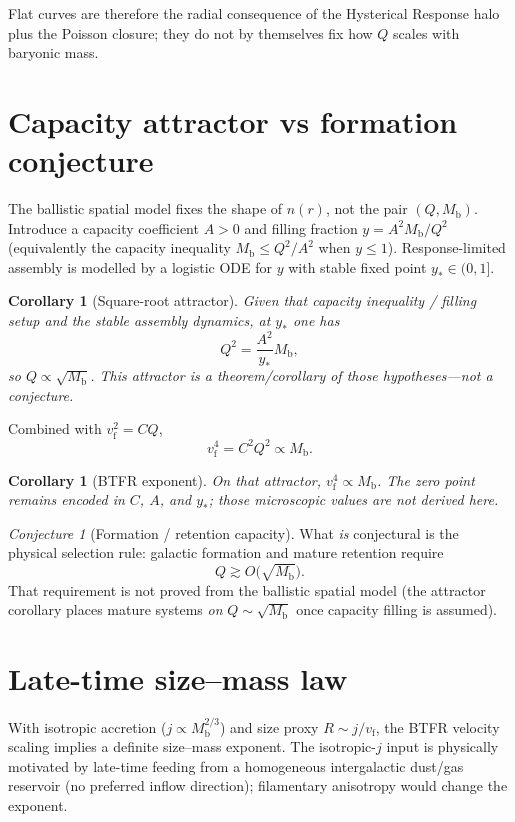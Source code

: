 \documentclass[11pt]{article}
\newtheorem{corollary}[theorem]{Corollary}
\theoremstyle{definition}
\theoremstyle{remark}
\newtheorem{conjecture}{Conjecture}
\newcommand{\Mb}{M_{\mathrm{b}}}
\newcommand{\vf}{v_{\mathrm{f}}}
\begin{document}
Flat curves are therefore the radial consequence of the Hysterical Response halo plus the Poisson closure; they do not by themselves fix how $Q$ scales with baryonic mass.

\section{Capacity attractor vs formation conjecture}
The ballistic spatial model fixes the shape of $n(r)$, not the pair $(Q,\Mb)$.
Introduce a capacity coefficient $A>0$ and filling fraction $y=A^{2}\Mb/Q^{2}$
(equivalently the capacity inequality $\Mb\le Q^{2}/A^{2}$ when $y\le1$).
Response-limited assembly is modelled by a logistic ODE for $y$ with stable fixed point $y_{\ast}\in(0,1]$.

\begin{corollary}[Square-root attractor]
\emph{Given} that capacity inequality / filling setup and the stable assembly dynamics, at $y_{\ast}$ one has
\begin{equation}
  Q^{2}=\frac{A^{2}}{y_{\ast}}\Mb,
\end{equation}
so $Q\propto\sqrt{\Mb}$.
This attractor is a theorem/corollary of those hypotheses---not a conjecture.
\end{corollary}

Combined with $\vf^{2}=CQ$,
\begin{equation}
  \vf^{4}=C^{2}Q^{2}\propto\Mb.
\end{equation}

\begin{corollary}[BTFR exponent]
On that attractor, $\vf^{4}\propto\Mb$.
The zero point remains encoded in $C$, $A$, and $y_{\ast}$; those microscopic values are not derived here.
\end{corollary}

\begin{conjecture}[Formation / retention capacity]
What \emph{is} conjectural is the physical selection rule: galactic formation and mature retention require
\[
  \boxed{Q\gtrsim O\bigl(\sqrt{\Mb}\bigr)}.
\]
That requirement is not proved from the ballistic spatial model (the attractor corollary places mature systems \emph{on} $Q\sim\sqrt{\Mb}$ once capacity filling is assumed).
\end{conjecture}

\section{Late-time size--mass law}
With isotropic accretion ($j\propto\Mb^{2/3}$) and size proxy $R\sim j/\vf$, the BTFR velocity scaling implies a definite size--mass exponent.
The isotropic-$j$ input is physically motivated by late-time feeding from a homogeneous intergalactic dust/gas reservoir (no preferred inflow direction); filamentary anisotropy would change the exponent.
\end{document}
